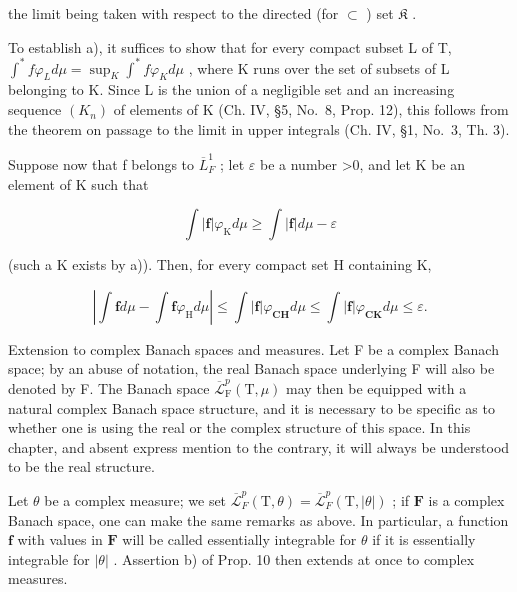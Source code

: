 the limit being taken with respect to the directed (for \(\subset\) ) set \(\mathfrak{K}\) .

To establish a), it suffices to show that for every compact subset L of T, \(\int^{*}f\varphi_{L}d\mu=\sup_{K}\int^{*}f\varphi_{K}d\mu\) , where K runs over the set of subsets of L belonging to K. Since L is the union of a negligible set and an increasing sequence \((K_{n})\) of elements of K (Ch. IV, §5, No.~8, Prop. 12), this follows from the theorem on passage to the limit in upper integrals (Ch. IV, §1, No.~3, Th. 3).

Suppose now that f belongs to \(\overline{L}_{F}^{1}\) ; let \(\varepsilon\) be a number \textgreater0, and let K be an element of K such that

\[
\int | \mathbf {f} | \varphi_ {\mathrm{K}} d \mu \geqslant \int | \mathbf {f} | d \mu - \varepsilon
\]

(such a K exists by a)). Then, for every compact set H containing K,

\[
\left| \int \mathbf {f} d \mu - \int \mathbf {f} \varphi_ {\mathrm{H}} d \mu \right| \leqslant \int | \mathbf {f} | \varphi_ {\mathbf {C H}} d \mu \leqslant \int | \mathbf {f} | \varphi_ {\mathbf {C K}} d \mu \leqslant \varepsilon .
\]

Extension to complex Banach spaces and measures. Let F be a complex Banach space; by an abuse of notation, the real Banach space underlying F will also be denoted by F. The Banach space \(\overline{\mathcal{L}}_{\mathrm{F}}^{p}(\mathrm{T},\mu)\) may then be equipped with a natural complex Banach space structure, and it is necessary to be specific as to whether one is using the real or the complex structure of this space. In this chapter, and absent express mention to the contrary, it will always be understood to be the real structure.

Let \(\theta\) be a complex measure; we set \(\overline{\mathcal{L}}_F^p (\mathrm{T},\theta) = \overline{\mathcal{L}}_F^p (\mathrm{T},|\theta |)\) ; if \(\mathbf{F}\) is a complex Banach space, one can make the same remarks as above. In particular, a function \(\mathbf{f}\) with values in \(\mathbf{F}\) will be called essentially integrable for \(\theta\) if it is essentially integrable for \(|\theta |\) . Assertion b) of Prop. 10 then extends at once to complex measures.

